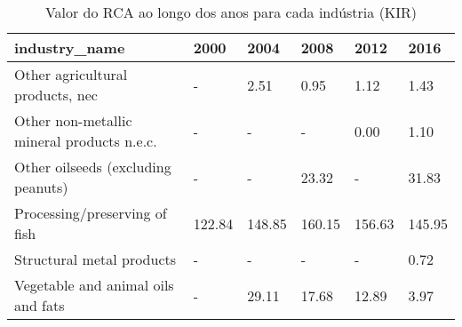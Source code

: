 \begin{table}
\centering
\caption{Valor do RCA ao longo dos anos para cada indústria (KIR)}
\begin{tabular}{p{6cm}p{1.5cm}p{1.5cm}p{1.5cm}p{1.5cm}p{1.5cm}}
\toprule
                             industry\_name &   2000 &   2004 &   2008 &   2012 &   2016 \\
\midrule
          Other agricultural products, nec &      - &   2.51 &   0.95 &   1.12 &   1.43 \\
Other non-metallic mineral products n.e.c. &      - &      - &      - &   0.00 &   1.10 \\
        Other oilseeds (excluding peanuts) &      - &      - &  23.32 &      - &  31.83 \\
             Processing/preserving of fish & 122.84 & 148.85 & 160.15 & 156.63 & 145.95 \\
                 Structural metal products &      - &      - &      - &      - &   0.72 \\
        Vegetable and animal oils and fats &      - &  29.11 &  17.68 &  12.89 &   3.97 \\
\bottomrule
\end{tabular}
\end{table}
